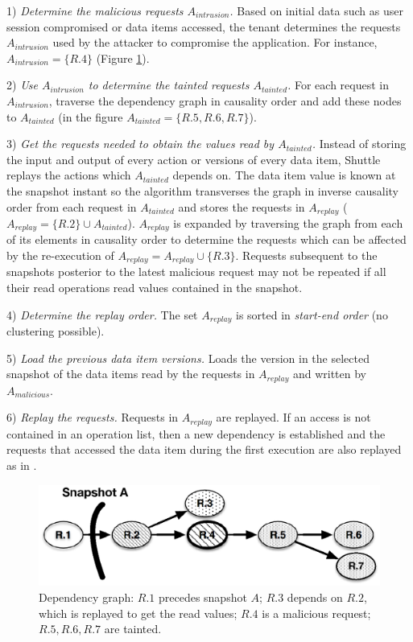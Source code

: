 {1)} \textit{Determine the malicious requests $A_{intrusion}$.}
  Based on initial data such as user session compromised or data items accessed, the tenant determines the requests $A_{intrusion}$ used by the attacker to compromise the application. For instance, $A_{intrusion} = \{R.4\} $ (Figure \ref{fig:selectiveGraph}).
  
{2)} \textit{Use $A_{intrusion}$ to determine the tainted requests $A_{tainted}$.}
  For each request in $A_{intrusion}$, traverse the dependency graph in causality order and add these nodes to $A_{tainted}$ (in the figure $A_{tainted} = \{R.5,R.6,R.7\}$).

{3)} \textit{Get the requests needed to obtain the values read by $A_{tainted}$.} %
  Instead of storing the input and output of every action or versions of every data item, Shuttle replays the actions which $A_{tainted}$ depends on. The data item value is known at the snapshot instant so the algorithm transverses the graph in inverse causality order from each request in $A_{tainted}$ and stores the requests in $A_{replay}$ ($A_{replay} = \{R.2\} \cup A_{tainted}$). $A_{replay}$ is expanded by traversing the graph from each of its elements in causality order to determine the requests which can be affected by the re-execution of $A_{replay} = A_{replay} \cup \{R.3\}$. Requests subsequent to the snapshots posterior to the latest malicious request may not be repeated if all their read operations read values contained in the snapshot. %

{4)} \textit{Determine the replay order.} 
  The set $A_{replay}$ is sorted in \emph{start-end order} (no clustering possible).

{5)} \textit{Load the previous data item versions.}
  Loads the version in the selected snapshot of the data items read by the requests in $A_{replay}$ and written by $A_{malicious}$.

{6)} \textit{Replay the requests.}
  Requests in $A_{replay}$ are replayed. If an access is not contained in an operation list, then a new dependency is established and the requests that accessed the data item during the first execution are also replayed as in \cite{retro}. 

\begin{figure}
  \centering
  \includegraphics[width=0.7\linewidth]{images/selectiveDependency_paper}
  \caption{{Dependency graph:} $R.1$ precedes snapshot $A$; $R.3$ depends on $R.2$, which is replayed to get the read values; $R.4$ is a malicious request; $R.5,R.6,R.7$ are tainted.}
  \label{fig:selectiveGraph}
\end{figure}


